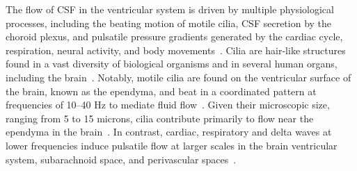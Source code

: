 \documentclass{WileyMSP-template}
\begin{document}
The flow of CSF in the ventricular system is driven by multiple
physiological processes, including the beating motion of motile
cilia, CSF secretion by the choroid plexus, and pulsatile pressure
gradients generated by the cardiac cycle, respiration, neural
activity, and body movements~\cite{Brodal2016, del2010ependymal,
Ringers2020Role, Vinje2019RespiratoryMeasurements,
Kurtcuoglu2005ComputationalSystem, Olstad2019CiliaryDevelopment,
macaulay2022cerebrospinal, mestre2018flow, Williams2023NeuralActivity}. 
Cilia are hair-like structures found in a vast diversity of
biological organisms and in
several human organs, including the brain~\cite{DGama2025MotileBrain,
Fulford1986Muco-ciliaryLung, Pacherres2022CiliaryProduction,
Jahn1972LocomotionProtozoa, Brennen1977FluidFlagella,
Ringers2020Role, spassky2013motile, Pellicciotta2020Cilia,
mitchell2007evolution, Tsukita2012CoordinatedFeet,
BLAKE1974MechanicsMotion,
Reiten2017Motile-Cilia-MediatedComputations,
Thouvenin2020OriginCanal}. Notably, motile cilia
are found on the ventricular surface of the brain,
known as the ependyma, and beat in a
coordinated pattern at frequencies of 10--40 Hz to mediate fluid
flow~\cite{mitchell2007evolution, Ringers2020Role, spassky2013motile,
Ringers2023NovelEpithelia, roth2025structure}. Given their
microscopic size, ranging from 5 to 15 microns, cilia contribute
primarily to flow near the ependyma in the
brain~\cite{Siyahhan2014FlowVentricles, Olstad2019CiliaryDevelopment,
Ringers2020Role, Faubel2016Cilia-basedVentricles}. In contrast,
cardiac, respiratory and delta waves at lower frequencies induce
pulsatile flow at larger scales in the brain ventricular system,
subarachnoid space, and perivascular
spaces~\cite{Vinje2019RespiratoryMeasurements, eide2024functional,
Causemann2025, fultz2019coupled, mestre2018flow,
daversin2020mechanisms}.
\end{document}
